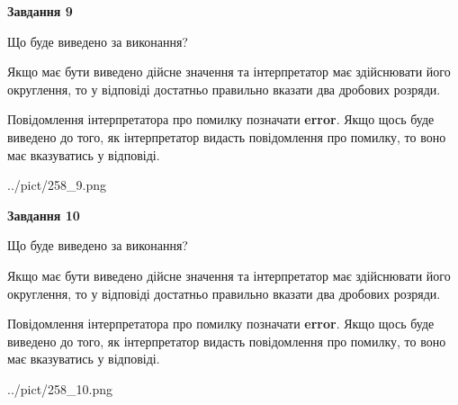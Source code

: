 \documentclass[12pt, ukrainian]{article}
\begin{document}
{\begin {Large}
{\begin {center}\textbf{Завдання 9}\end {center}}\par
Що буде виведено за виконання? \par

Якщо має бути виведено дійсне значення та інтерпретатор має здійснювати його округлення, 
то у відповіді достатньо правильно вказати два дробових розряди.

Повідомлення інтерпретатора про помилку позначати \textbf{error}.
Якщо щось буде виведено до того, як інтерпретатор видасть повідомлення про помилку, 
то воно має вказуватись у відповіді. \par

\begin{center}
	{../pict/258_9.png}
\end{center}
\newpage

{\begin {center}\textbf{Завдання 10}\end {center}}\par
Що буде виведено за виконання? \par

Якщо має бути виведено дійсне значення та інтерпретатор має здійснювати його округлення, 
то у відповіді достатньо правильно вказати два дробових розряди.

Повідомлення інтерпретатора про помилку позначати \textbf{error}.
Якщо щось буде виведено до того, як інтерпретатор видасть повідомлення про помилку, 
то воно має вказуватись у відповіді. \par

\begin{center}
	{../pict/258_10.png}
\end{center}
\newpage

\end {Large}}
\end{document}
